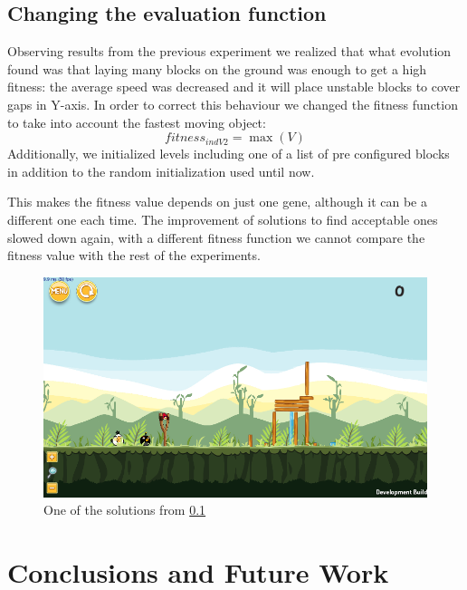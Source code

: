 \documentclass[a4paper,twoside]{article}
\begin{document}
\subsection{Changing the evaluation function}\label{E6}

Observing results from the previous experiment we realized that what
evolution found was that laying many blocks on the ground was enough
to get a high fitness: the average speed was decreased and it will
place unstable blocks to cover gaps in Y-axis. In
order to correct this behaviour we changed the 
fitness function to take into account the fastest moving object:
$$fitness_{indV2} = \max{(V)}$$
Additionally, we initialized levels including one of a list of pre configured
blocks in addition to the random initialization used until
now.

This makes the fitness value depends on just one gene, although it can be a
different one each time. The improvement of solutions to find acceptable ones
slowed down %
again, with a different fitness function we cannot compare the fitness
value with the rest of the experiments. 
 \begin{figure}
 	\centering
 	\includegraphics[scale=0.3]{E6.png}
 	\caption{One of the solutions from \ref{E6}}\label{f:e6}
 \end{figure}





%
\section{Conclusions and Future Work} 
\label{sec:conclusions}
\end{document}
